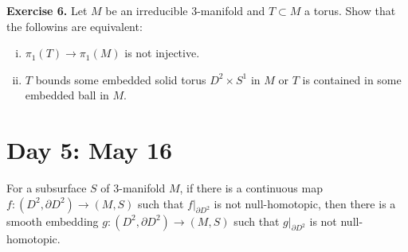 \documentclass{../../small}
\begin{document}
\textbf{Exercise 6.} Let $M$ be an irreducible 3-manifold and $T\subset M$ a torus.
Show that the followins are equivalent:
\begin{enumerate}[(i)]
\item $\pi_1(T)\to\pi_1(M)$ is not injective.
\item $T$ bounds some embedded solid torus $D^2\times S^1$ in $M$ or $T$ is contained in some embedded ball in $M$.
\end{enumerate}

\newpage
\section{Day 5: May 16}
\setcounter{section}{4}
\begin{thm}
For a subsurface $S$ of 3-manifold $M$, if there is a continuous map $f:(D^2,\partial D^2)\to(M,S)$ such that $f|_{\partial D^2}$ is not null-homotopic, then there is a smooth embedding $g:(D^2,\partial D^2)\to(M,S)$ such that $g|_{\partial D^2}$ is not null-homotopic.
\end{thm}
\end{document}
